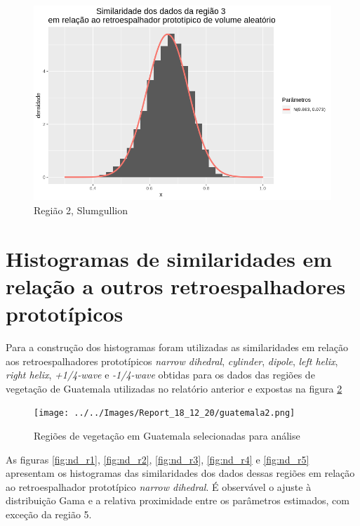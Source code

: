 \documentclass[12pt]{article}
\begin{document}
\begin{figure}[!h]
    \centering
    \includegraphics[width = \linewidth]{../../Images/Report_18_12_20/slum_rv_region3.png}
    \caption{Região 2, Slumgullion}
    \label{fig:slum_rv_r3}
\end{figure}

\section{Histogramas de similaridades em relação a outros retroespalhadores prototípicos}

Para a construção dos histogramas foram utilizadas as similaridades em relação aos retroespalhadores prototípicos \textit{narrow dihedral}, \textit{cylinder}, \textit{dipole}, \textit{left helix}, \textit{right helix}, \textit{+1/4-wave} e \textit{-1/4-wave} obtidas para os dados das regiões de vegetação de Guatemala utilizadas no relatório anterior e expostas na figura \ref{fig:guatemala}

\begin{figure}[!h]
    \centering
    \texttt{[image: ../../Images/Report\_18\_12\_20/guatemala2.png]}
    \caption{Regiões de vegetação em Guatemala selecionadas para análise}
    \label{fig:guatemala}
\end{figure}

As figuras \ref{fig:nd_r1}, \ref{fig:nd_r2}, \ref{fig:nd_r3}, \ref{fig:nd_r4} e \ref{fig:nd_r5} apresentam os histogramas das similaridades dos dados dessas regiões em relação ao retroespalhador prototípico \textit{narrow dihedral}. É observável o ajuste à distribuição Gama e a relativa proximidade entre os parâmetros estimados, com exceção da região 5.
\end{document}
